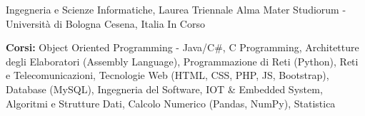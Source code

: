 

\begin{cventries}

  \cventry
    {Ingegneria e Scienze Informatiche, Laurea Triennale} %
    {Alma Mater Studiorum - Università di Bologna} %
    {Cesena, Italia} %
    {In Corso} %
    {
      \begin{cvitems} %
        \item {\textbf{Corsi:} Object Oriented Programming - Java/C\#, C Programming, Architetture degli Elaboratori (Assembly Language), Programmazione di Reti (Python), Reti e Telecomunicazioni, Tecnologie Web (HTML, CSS, PHP, JS, Bootstrap), Database (MySQL), Ingegneria del Software, IOT \& Embedded System, Algoritmi e Strutture Dati, Calcolo Numerico (Pandas, NumPy), Statistica}
      \end{cvitems}
    }
    
\end{cventries}

